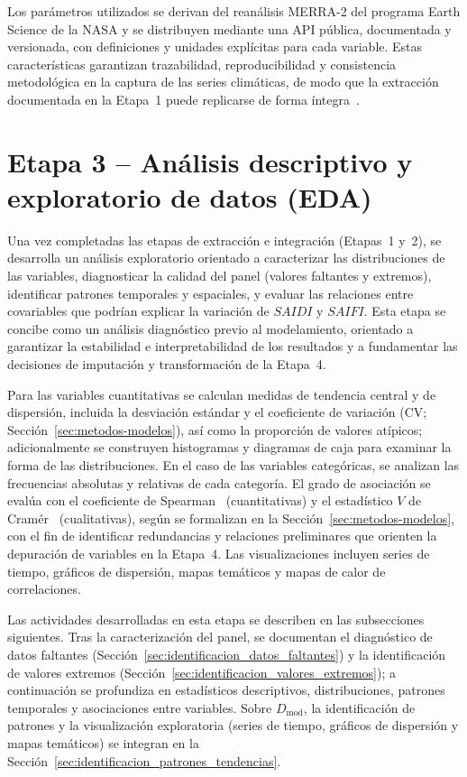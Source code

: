     Los parámetros utilizados se derivan del reanálisis MERRA-2 del programa Earth Science de la NASA y se distribuyen mediante una API pública, documentada y versionada, con definiciones y unidades explícitas para cada variable. Estas características garantizan trazabilidad, reproducibilidad y consistencia metodológica en la captura de las series climáticas, de modo que la extracción documentada en la Etapa~1 puede replicarse de forma íntegra~\textcite{ref48}.
    




\section{Etapa 3 – Análisis descriptivo y exploratorio de datos (EDA)}
\label{sec:metodología-etapa3}

Una vez completadas las etapas de extracción e integración (Etapas~1 y~2), se desarrolla un análisis exploratorio orientado a caracterizar las distribuciones de las variables, diagnosticar la calidad del panel (valores faltantes y extremos), identificar patrones temporales y espaciales, y evaluar las relaciones entre covariables que podrían explicar la variación de $SAIDI$ y $SAIFI$. Esta etapa se concibe como un análisis diagnóstico previo al modelamiento, orientado a garantizar la estabilidad e interpretabilidad de los resultados y a fundamentar las decisiones de imputación y transformación de la Etapa~4.

Para las variables cuantitativas se calculan medidas de tendencia central y de dispersión, incluida la desviación estándar y el coeficiente de variación (CV; Sección~\ref{sec:metodos-modelos}), así como la proporción de valores atípicos; adicionalmente se construyen histogramas y diagramas de caja para examinar la forma de las distribuciones. En el caso de las variables categóricas, se analizan las frecuencias absolutas y relativas de cada categoría. El grado de asociación se evalúa con el coeficiente de Spearman~\textcite{ref53} (cuantitativas) y el estadístico $V$ de Cramér~\textcite{ref54} (cualitativas), según se formalizan en la Sección~\ref{sec:metodos-modelos}, con el fin de identificar redundancias y relaciones preliminares que orienten la depuración de variables en la Etapa~4. Las visualizaciones incluyen series de tiempo, gráficos de dispersión, mapas temáticos y mapas de calor de correlaciones.

Las actividades desarrolladas en esta etapa se describen en las subsecciones siguientes. Tras la caracterización del panel, se documentan el diagnóstico de datos faltantes (Sección~\ref{sec:identificacion_datos_faltantes}) y la identificación de valores extremos (Sección~\ref{sec:identificacion_valores_extremos}); a continuación se profundiza en estadísticos descriptivos, distribuciones, patrones temporales y asociaciones entre variables. Sobre $D_{\mathrm{mod}}$, la identificación de patrones y la visualización exploratoria (series de tiempo, gráficos de dispersión y mapas temáticos) se integran en la Sección~\ref{sec:identificacion_patrones_tendencias}.

